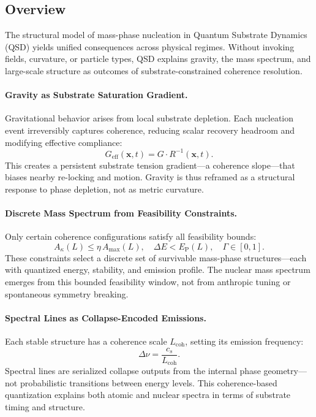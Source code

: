 \documentclass[preprints,article,submit,pdftex,moreauthors]{Definitions/mdpi}
\begin{document}
\subsection[\appendixname~\thesubsection]{Overview}

The structural model of mass-phase nucleation in Quantum Substrate Dynamics (QSD) yields unified consequences across physical regimes. Without invoking fields, curvature, or particle types, QSD explains gravity, the mass spectrum, and large-scale structure as outcomes of substrate-constrained coherence resolution.

\paragraph{Gravity as Substrate Saturation Gradient.}
Gravitational behavior arises from local substrate depletion. Each nucleation event irreversibly captures coherence, reducing scalar recovery headroom and modifying effective compliance:
\[
G_{\mathrm{eff}}(\mathbf{x},t) = G \cdot R^{-1}(\mathbf{x},t).
\]
This creates a persistent substrate tension gradient—a coherence slope—that biases nearby re-locking and motion. Gravity is thus reframed as a structural response to phase depletion, not as metric curvature.

\paragraph{Discrete Mass Spectrum from Feasibility Constraints.}
Only certain coherence configurations satisfy all feasibility bounds:
\[
A_\kappa(L) \le \eta\,A_{\max}(L), \quad \Delta E < E_{\mathrm{P}}(L), \quad \Gamma \in [0,1].
\]
These constraints select a discrete set of survivable mass-phase structures—each with quantized energy, stability, and emission profile. The nuclear mass spectrum emerges from this bounded feasibility window, not from anthropic tuning or spontaneous symmetry breaking.

\paragraph{Spectral Lines as Collapse-Encoded Emissions.}
Each stable structure has a coherence scale \( L_{\mathrm{coh}} \), setting its emission frequency:
\[
\Delta \nu = \frac{c_s}{L_{\mathrm{coh}}}.
\]
Spectral lines are serialized collapse outputs from the internal phase geometry—not probabilistic transitions between energy levels. This coherence-based quantization explains both atomic and nuclear spectra in terms of substrate timing and structure.
\end{document}
